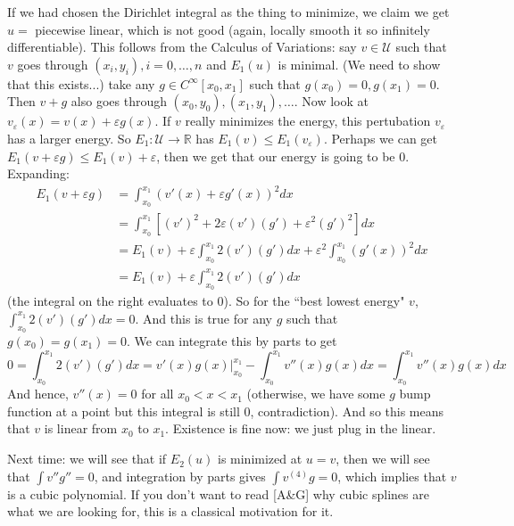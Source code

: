 \documentclass{article}
\theoremstyle{plain}
\theoremstyle{remark}
\newcommand{\R}{{\mathbb R}}
\newcommand{\ep}{{\varepsilon}}
\begin{document}
If we had chosen the Dirichlet integral as the thing to minimize,
we claim we get $u = $ piecewise linear, which is not good
(again, locally smooth it so infinitely differentiable).
This follows from the Calculus of Variations:
say $v \in \mathcal{U}$ such that $v$ goes through
$(x_i,y_i), i = 0,\dots,n$ and $E_1(u)$ is minimal.
(We need to show that this exists...)
take any $g \in C^\infty [x_0,x_1]$ such that $g(x_0) = 0, g(x_1) = 0$.
Then $v + g$ also goes through $(x_0,y_0),(x_1,y_1),\dots$.
Now look at $v_\ep(x) = v(x) + \ep g(x)$.
If $v$ really minimizes the energy, this pertubation $v_\ep$ has a larger energy.
So $E_1 \colon \mathcal{U} \to \R$ has $E_1(v) \leq E_1(v_\ep)$.
Perhaps we can get $E_1(v+\ep g) \leq E_1(v) + \ep$,
then we get that our energy is going to be $0$. Expanding:
\begin{align*}
	E_1(v + \ep g)
	&= \int_{x_0}^{x_1} (v'(x) + \ep g'(x))^2 dx\\
	&= \int_{x_0}^{x_1} \left[ (v')^2 + 2\ep(v')(g') + \ep^2 (g')^2 \right]dx\\
	&= E_1(v) + \ep \int_{x_0}^{x_1} 2(v')(g')dx + \ep^2\int_{x_0}^{x_1} (g'(x))^2dx\\
	&= E_1(v) + \ep \int_{x_0}^{x_1} 2(v')(g')dx
\end{align*}
(the integral on the right evaluates to $0$).
So for the ``best lowest energy" $v$,
$\int_{x_0}^{x_1} 2(v')(g')dx = 0$.
And this is true for any $g$ such that $g(x_0) = g(x_1) = 0$.
We can integrate this by parts to get
\[
	0 = \int_{x_0}^{x_1} 2(v')(g')dx = v'(x)g(x) \big\vert_{x_0}^{x_1}
	- \int_{x_0}^{x_1} v''(x)g(x)dx
	= \int_{x_0}^{x_1} v''(x)g(x)dx
\]
And hence, $v''(x) = 0$ for all $x_0 < x < x_1$
(otherwise, we have some $g$ bump function at a point
but this integral is still $0$, contradiction).
And so this means that $v$ is linear from $x_0$ to $x_1$.
Existence is fine now: we just plug in the linear.

Next time: we will see that if $E_2(u)$ is minimized at $u = v$,
then we will see that $\int v'' g'' = 0$, and integration by parts gives
$\int v^{(4)}g = 0$, which implies that $v$ is a cubic polynomial.
If you don't want to read [A\&G] why cubic splines are what we are looking for,
this is a classical motivation for it.
\end{document}
